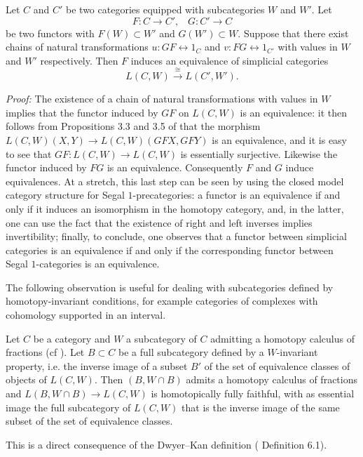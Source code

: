 \begin{lemma}
\label{nonadjoint}
Let $C$ and $C'$ be two
categories equipped with subcategories $W$ and $W'$. Let
$$
F: C\rightarrow C' ,\;\;\; G: C' \rightarrow C
$$
be two functors with $F(W)\subset W'$ and $G(W')\subset W$.
Suppose that there exist chains of natural transformations $u:
GF\leftrightarrow
1_{C}$
and $v: FG \leftrightarrow 1_{C'}$
with values in $W$ and $W'$ respectively.
Then $F$ induces an equivalence of simplicial
categories $$
L(C,W)\stackrel{\cong}{\rightarrow}L(C',W').
$$
\end{lemma}
{\em Proof:} The existence of a chain of natural transformations with
values in $W$
implies that the functor induced by
$GF$ on $L(C,W)$ is an equivalence: it then follows from
Propositions 3.3 and
3.5 of \cite{DwyerKan2} that the morphism $L(C,W)(X,Y)\rightarrow
L(C,W)(GFX,GFY)$ is
an equivalence, and it is easy to see that $GF:L(C,W)\rightarrow
L(C,W)$ is
essentially surjective. Likewise the functor induced by $FG$ is an
equivalence. Consequently $F$ and $G$ induce equivalences.
At a stretch, this last step can be seen by using the
closed model category structure for Segal $1$-precategories:
a functor is an equivalence if and only if it induces an
isomorphism in the homotopy category, and, in the latter, one can
use the fact that the existence of right and left inverses implies
invertibility; finally, to conclude, one observes that a functor between
simplicial
categories is an equivalence if and only if the corresponding functor
between Segal $1$-categories is an equivalence.
\eop

The following observation is useful for dealing with subcategories
defined by homotopy-invariant conditions, for
example categories of complexes with cohomology supported in an
interval.

\begin{proposition}
\label{stabilite}
Let $C$ be a category and $W$ a subcategory of $C$ admitting a
homotopy
calculus of fractions
(cf \cite{GabrielZisman}).
Let $B\subset C$ be a full subcategory defined
by a $W$-invariant property, i.e. the inverse image of a subset
$B'$ of the set of equivalence classes of objects of $L(C,W)$.
Then $(B, W\cap B)$ admits a homotopy calculus of fractions and $L(B, W\cap
B)\rightarrow L(C,W)$ is homotopically fully faithful, with as essential
image the full subcategory of $L(C,W)$ that is the inverse image of the
same subset of the set of equivalence classes.
\end{proposition}
This is a direct consequence of the Dwyer--Kan definition
(\cite{DwyerKan2} Definition 6.1).
\eop

